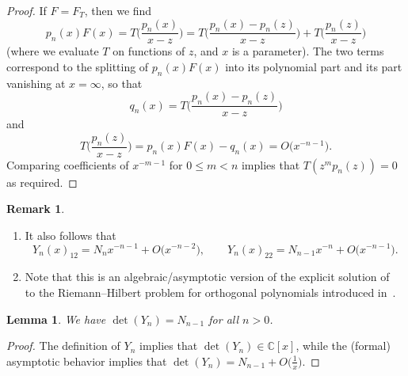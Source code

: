 \documentclass[pdftex]{sigma}
\newcommand{\CN}{\mathbb{C}} %
\newtheorem{Lemma}[Theorem]{Lemma}
\theoremstyle{definition}
\newtheorem{Remark}[Theorem]{Remark}
\numberwithin{equation}{section}
\begin{document}
\begin{proof}
 If $F=F_T$, then we find
 \[
 p_n(x) F(x) = T\bigg(\frac{p_n(x)}{x-z}\bigg) = T\bigg(\frac{p_n(x)-p_n(z)}{x-z}\bigg) +
 T\bigg(\frac{p_n(z)}{x-z}\bigg)
 \]
 (where we evaluate $T$ on functions of $z$, and $x$ is a parameter).
 The two terms correspond to the splitting of $p_n(x)F(x)$ into its
 polynomial part and its part vanishing at $x=\infty$, so that
 \[
 q_n(x) = T\bigg(\frac{p_n(x)-p_n(z)}{x-z}\bigg)
 \]
 and
 \[
 T\bigg(\frac{p_n(z)}{x-z}\bigg) = p_n(x)F(x)-q_n(x) = O\big(x^{-n-1}\big).
 \]
 Comparing coefficients of $x^{-m-1}$ for $0\le m<n$ implies that $T(z^m
 p_n(z))=0$ as required.
\end{proof}

{\samepage
\begin{Remark}\qquad
\begin{enumerate}\itemsep=0pt
\item[1.] It also follows that
 \[
 Y_n(x)_{12}=N_n x^{-n-1}+O\big(x^{-n-2}\big),\qquad Y_n(x)_{22}=N_{n-1} x^{-n}+O\big(x^{-n-1}\big).
 \]

\item[2.] Note that this is an algebraic/asymptotic version of the explicit solution of~\cite{BI} to the Riemann--Hilbert problem for orthogonal polynomials introduced in~\cite{FIK}.
\end{enumerate}
\end{Remark}

}

\begin{Lemma}
 We have $\det(Y_n)=N_{n-1}$ for all $n>0$.
\end{Lemma}

\begin{proof}
 The definition of $Y_n$ implies that $\det(Y_n)\in \CN[x]$, while the
 (formal) asymptotic behavior implies that $\det(Y_n)=N_{n-1}+O\big(\frac{1}{x}\big)$.
\end{proof}
\end{document}
